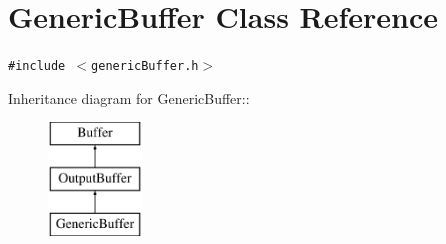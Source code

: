 \hypertarget{classGenericBuffer}{
\section{GenericBuffer Class Reference}
\label{classGenericBuffer}
}
{\tt \#include $<$genericBuffer.h$>$}

Inheritance diagram for GenericBuffer::\begin{figure}[H]
\begin{center}
\leavevmode
\includegraphics[height=3cm]{classGenericBuffer}
\end{center}
\end{figure}
